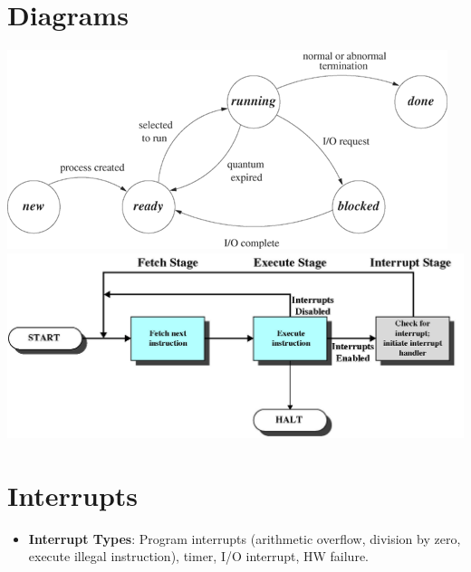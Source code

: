 \documentclass[fontsize=5pt]{scrartcl}
\begin{document}
\begin{multicols}{3}
  \section{Diagrams}
    \includegraphics[scale=0.25]{process_state.png} \\
    \includegraphics[scale=0.25]{interrupt_cycle.png} \\
    
   \section{Interrupts}
      \begin{itemize}
        \item \textbf{Interrupt Types}: Program interrupts (arithmetic overflow, division by zero, execute illegal instruction), timer, I/O interrupt, HW failure.
      \end{itemize}

\end{multicols}
\end{document}
